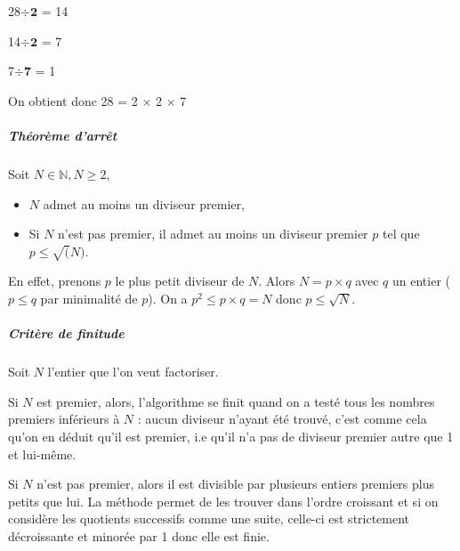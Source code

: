 \documentclass[11pt,a4paper]{article}
\begin{document}
	28$\div$$\mathbf{2}$ = 14
	
	14$\div$$\mathbf{2}$ = 7
	
	7$\div$$\mathbf{7}$ = 1
	
	On obtient donc 28 = 2 $\times$ 2 $\times$ 7
	
	\subparagraph{Théorème d'arrêt}
	
	Soit $N \in \mathbb{N}, N \ge 2$, 
	\begin{itemize}
		\item $N$ admet au moins un diviseur premier,
		\item Si $N$ n'est pas premier, il admet au moins un diviseur premier $p$ tel que $p \le \sqrt(N)$.
	\end{itemize}
	
	En effet, prenons $p$ le plus petit diviseur de $N$. Alors $N = p \times q$  avec $q$ un entier ($p \le q$ par minimalité de $p$). On a ${p^2 \le p \times q = N}$ donc $p \le \sqrt{N}$. 
	
	\subparagraph{Critère de finitude}	
	
	Soit $N$ l'entier que l'on veut factoriser. 
	
	Si $N$ est premier, alors, l'algorithme se finit quand on a testé tous les nombres premiers inférieurs à $N$ : aucun diviseur n'ayant été trouvé, c'est comme cela qu'on en déduit qu'il est premier, i.e qu'il n'a pas de diviseur premier autre que 1 et lui-même. 
	
	Si $N$ n'est pas premier, alors il est divisible par plusieurs entiers premiers plus petits que lui. La méthode permet de les trouver dans l'ordre croissant et si on considère les quotients successifs comme une suite, celle-ci est strictement décroissante et minorée par 1 donc elle est finie.
	
\end{document}
